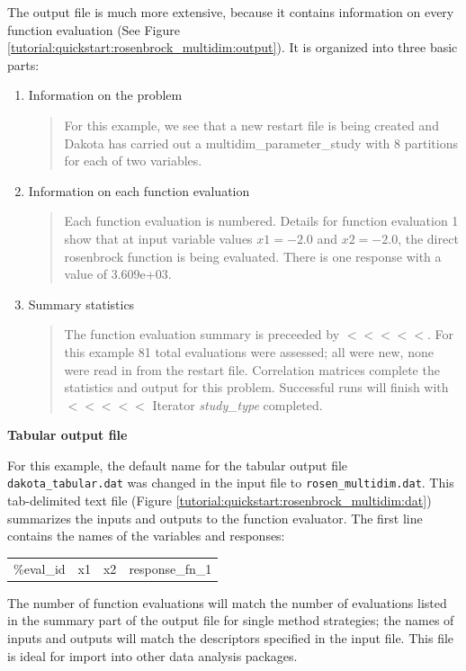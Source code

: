 The output file is much more extensive, because it
contains information on every function evaluation (See Figure
\ref{tutorial:quickstart:rosenbrock_multidim:output}). It is 
organized into three basic parts:
\begin{enumerate}
\item Information on the problem
\begin{quote}
For this example, we see that a new restart file is being created
and Dakota has carried out a multidim\_parameter\_study with
8 partitions for each of two variables.
\end{quote}
\item Information on each function evaluation 
\begin{quote}
Each function evaluation is numbered. Details for function evaluation
1 show that at input variable values $x1= -2.0$ and $x2=-2.0$, 
the direct rosenbrock function is being evaluated.  There is one response
with a value of 3.609e+03.
\end{quote}
\item Summary statistics
\begin{quote}
The function evaluation summary is preceeded by $<<<<<$. For this
example 81 total evaluations were assessed; all were new, none were
read in from the restart file. Correlation matrices complete the statistics
and output for this problem. Successful runs will finish with
$<<<<<$ Iterator {\it study\_type} completed.
\end{quote}
\end{enumerate}

{\textbf{Tabular output file}}

For this example, the default name for the tabular output file 
\texttt{dakota\_tabular.dat} was changed in the input file to
\texttt{rosen\_multidim.dat}. This tab-delimited text file
(Figure \ref{tutorial:quickstart:rosenbrock_multidim:dat})
summarizes the inputs and outputs to the function evaluator.
The first line contains the names of the variables and responses: 
\newline
\begin{tabular}{llll}
\%eval\_id           &  x1  &           x2&  response\_fn\_1 \\
\end{tabular}
\newline
The number of function evaluations will match the number of 
evaluations listed in the summary part of the output file for
single method strategies; the
names of inputs and outputs will match the descriptors 
specified in the input file. This file is ideal for import into
other data analysis packages.


